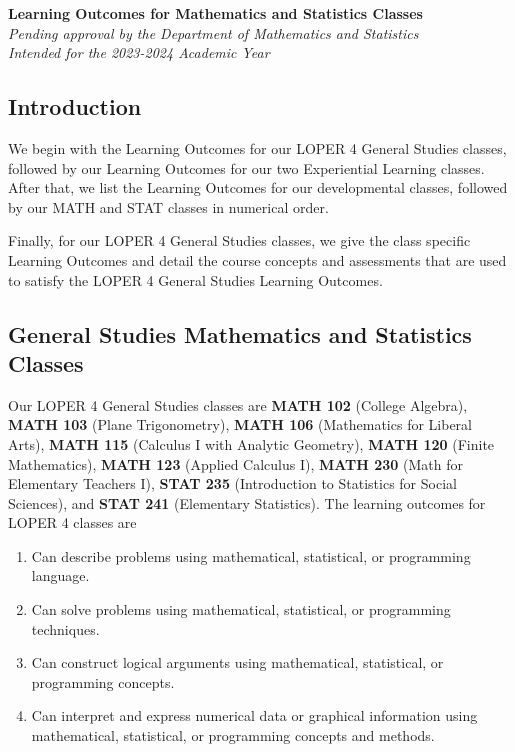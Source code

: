 \documentclass[11pt]{article}
\newenvironment{alphalist}{
\begin{enumerate}[label=(\arabic*),widest=107 ,leftmargin=25pt, itemsep=0pt]}
{\end{enumerate}}
\begin{document}
\begin{flushleft}
    \Large
\textbf{Learning Outcomes for Mathematics and Statistics Classes} \\
\vspace{0.25in}
\normalsize
\emph{Pending approval by the Department of Mathematics and Statistics}\\
\emph{Intended for the 2023-2024 Academic Year}
\end{flushleft}

\subsection{Introduction}

We begin with the Learning Outcomes for our LOPER 4 General Studies  
classes, followed by our Learning Outcomes for our two Experiential Learning
classes. After that, we list the Learning Outcomes for our developmental classes,
followed by our MATH and STAT classes in numerical order.


Finally, for our LOPER 4 General Studies classes, we give the class specific 
Learning Outcomes and detail the course concepts and assessments that are
used to satisfy the LOPER 4 General Studies Learning Outcomes.

\subsection{General Studies Mathematics and Statistics Classes}

Our LOPER 4 General Studies classes are 
\textbf{MATH 102} (College Algebra),
\textbf{MATH 103} (Plane Trigonometry),
\textbf{MATH 106} (Mathematics for Liberal Arts),
\textbf{MATH 115} (Calculus I with Analytic Geometry),
\textbf{MATH 120} (Finite Mathematics),
\textbf{MATH 123} (Applied Calculus I),
\textbf{MATH 230} (Math for Elementary Teachers I),
\textbf{STAT 235} (Introduction to  Statistics for  Social Sciences),
and \textbf{STAT 241}  (Elementary Statistics). The learning outcomes for LOPER  4  classes are

\begin{alphalist}
\item Can describe problems using mathematical, statistical, or programming language.
\item Can solve problems using mathematical, statistical, or programming techniques.
\item Can construct logical arguments using mathematical, statistical, or programming concepts.
\item Can interpret and express numerical data or graphical information using 
   mathematical, statistical, or programming concepts and methods.
\end{alphalist}
\end{document}
